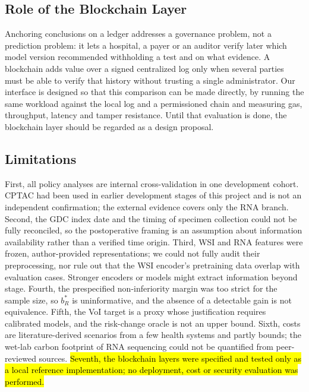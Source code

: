 \documentclass[journal,twoside,web]{IEEEtran}
\newcommand{\bc}[1]{\hl{#1}}
\newcommand{\bct}[1]{\texorpdfstring{\colorbox{chainbg}{#1}}{#1}}
\newcommand{\bc}[1]{#1}
\newcommand{\bct}[1]{#1}
\begin{document}
\subsection{\bct{Role of the Blockchain Layer}}
\begin{chainbox}
Anchoring conclusions on a ledger addresses a governance problem, not a prediction problem: it lets a hospital, a payer or an auditor verify later which model version recommended withholding a test and on what evidence. A blockchain adds value over a signed centralized log only when several parties must be able to verify that history without trusting a single administrator. Our interface is designed so that this comparison can be made directly, by running the same workload against the local log and a permissioned chain and measuring gas, throughput, latency and tamper resistance. Until that evaluation is done, the blockchain layer should be regarded as a design proposal.
\end{chainbox}

\subsection{Limitations}
First, all policy analyses are internal cross-validation in one development cohort. CPTAC had been used in earlier development stages of this project and is not an independent confirmation; the external evidence covers only the RNA branch. Second, the GDC index date and the timing of specimen collection could not be fully reconciled, so the postoperative framing is an assumption about information availability rather than a verified time origin. Third, WSI and RNA features were frozen, author-provided representations; we could not fully audit their preprocessing, nor rule out that the WSI encoder's pretraining data overlap with evaluation cases. Stronger encoders or models might extract information beyond stage. Fourth, the prespecified non-inferiority margin was too strict for the sample size, so $b_R^*$ is uninformative, and the absence of a detectable gain is not equivalence. Fifth, the VoI target is a proxy whose justification requires calibrated models, and the risk-change oracle is not an upper bound. Sixth, costs are literature-derived scenarios from a few health systems and partly bounds; the wet-lab carbon footprint of RNA sequencing could not be quantified from peer-reviewed sources. \bc{Seventh, the blockchain layers were specified and tested only as a local reference implementation; no deployment, cost or security evaluation was performed.}
\end{document}
